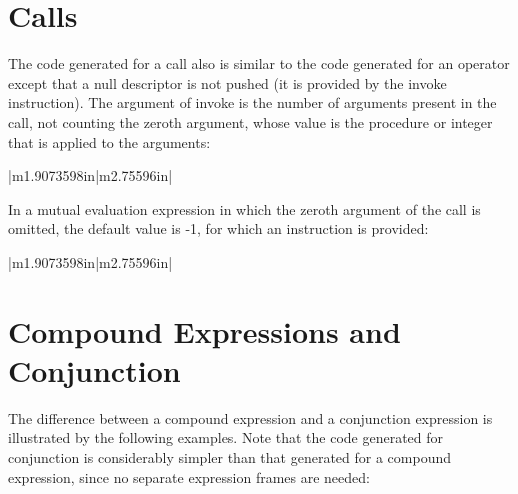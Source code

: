 \section{Calls}

The code generated for a call also is similar to the code generated
for an operator except that a null descriptor is not pushed (it is
provided by the invoke instruction). The argument of invoke is the
number of arguments present in the call, not counting the zeroth
argument, whose value is the procedure or integer that is applied to
the arguments:

\begin{center}
\tablelasttail{\hline}
\begin{xtabular}{|m{1.9073598in}|m{2.75596in}|}

\end{xtabular}
\end{center}

In a mutual evaluation expression in which the zeroth argument of the
{\textquotedbl}call{\textquotedbl} is omitted, the default value is
-1, for which an instruction is provided:

\begin{center}
\tablelasttail{\hline}
\begin{xtabular}{|m{1.9073598in}|m{2.75596in}|}

\end{xtabular}
\end{center}


\section{Compound Expressions and Conjunction}

The difference between a compound expression and a conjunction
expression is illustrated by the following examples. Note that the
code generated for conjunction is considerably simpler than that
generated for a compound expression, since no separate expression
frames are needed:

